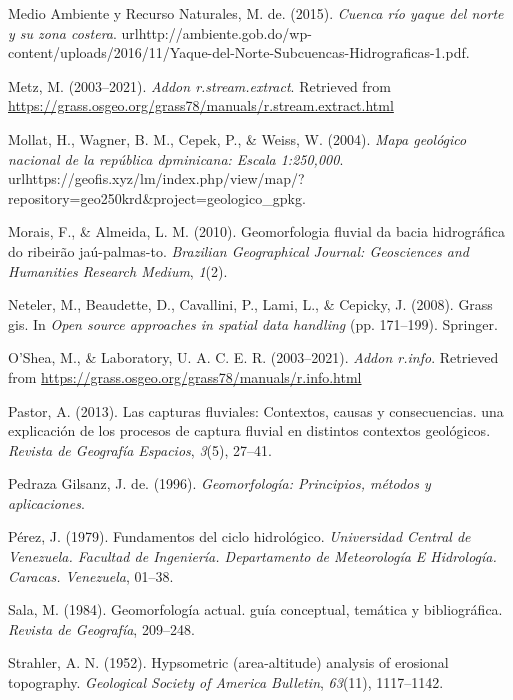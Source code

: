 \documentclass[11pt,]{article}
\begin{document}
\hypertarget{ref-Mmar2015cuenca}{}
Medio Ambiente y Recurso Naturales, M. de. (2015). \emph{Cuenca río
yaque del norte y su zona costera}.
urlhttp://ambiente.gob.do/wp-content/uploads/2016/11/Yaque-del-Norte-Subcuencas-Hidrograficas-1.pdf.

\hypertarget{ref-streamnextractmarkus}{}
Metz, M. (2003--2021). \emph{Addon r.stream.extract}. Retrieved from
\url{https://grass.osgeo.org/grass78/manuals/r.stream.extract.html}

\hypertarget{ref-Mollat2004mapa}{}
Mollat, H., Wagner, B. M., Cepek, P., \& Weiss, W. (2004). \emph{Mapa
geológico nacional de la república dpminicana: Escala 1:250,000}.
urlhttps://geofis.xyz/lm/index.php/view/map/?repository=geo250krd\&project=geologico\_gpkg.

\hypertarget{ref-morais2010geomorfologia}{}
Morais, F., \& Almeida, L. M. (2010). Geomorfologia fluvial da bacia
hidrográfica do ribeirão jaú-palmas-to. \emph{Brazilian Geographical
Journal: Geosciences and Humanities Research Medium}, \emph{1}(2).

\hypertarget{ref-neteler2008grass}{}
Neteler, M., Beaudette, D., Cavallini, P., Lami, L., \& Cepicky, J.
(2008). Grass gis. In \emph{Open source approaches in spatial data
handling} (pp. 171--199). Springer.

\hypertarget{ref-rinfo}{}
O'Shea, M., \& Laboratory, U. A. C. E. R. (2003--2021). \emph{Addon
r.info}. Retrieved from
\url{https://grass.osgeo.org/grass78/manuals/r.info.html}

\hypertarget{ref-pastor2013capturas}{}
Pastor, A. (2013). Las capturas fluviales: Contextos, causas y
consecuencias. una explicación de los procesos de captura fluvial en
distintos contextos geológicos. \emph{Revista de Geografía Espacios},
\emph{3}(5), 27--41.

\hypertarget{ref-pedraza1996geomorfologia}{}
Pedraza Gilsanz, J. de. (1996). \emph{Geomorfología: Principios, métodos
y aplicaciones}.

\hypertarget{ref-perez1979fundamentos}{}
Pérez, J. (1979). Fundamentos del ciclo hidrológico. \emph{Universidad
Central de Venezuela. Facultad de Ingeniería. Departamento de
Meteorología E Hidrología. Caracas. Venezuela}, 01--38.

\hypertarget{ref-sala1984geomorfologia}{}
Sala, M. (1984). Geomorfología actual. guía conceptual, temática y
bibliográfica. \emph{Revista de Geografía}, 209--248.

\hypertarget{ref-strahler1952hypsometric}{}
Strahler, A. N. (1952). Hypsometric (area-altitude) analysis of
erosional topography. \emph{Geological Society of America Bulletin},
\emph{63}(11), 1117--1142.
\end{document}
